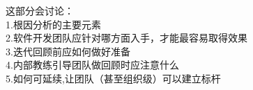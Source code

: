 \documentclass{book}        %
\begin{document}
这部分会讨论： \\

1.根因分析的主要元素\\
2.软件开发团队应针对哪方面入手，才能最容易取得效果\\
3.迭代回顾前应如何做好准备\\
4.内部教练引导团队做回顾时应注意什么\\
5.如何可延续,让团队（甚至组织级）可以建立标杆\\








%

%

%

%

%

%





\end{document}
